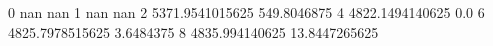 0 nan nan
1 nan nan
2 5371.9541015625 549.8046875
4 4822.1494140625 0.0
6 4825.7978515625 3.6484375
8 4835.994140625 13.8447265625
